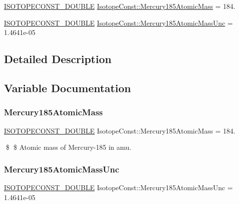 \begin{DoxyCompactItemize}
\item 
\mbox{\hyperlink{group___isotope_const-_macros_ga8f45a7272ce02c0b4c65c44636ed719a}{I\+S\+O\+T\+O\+P\+E\+C\+O\+N\+S\+T\+\_\+\+D\+O\+U\+B\+LE}} \mbox{\hyperlink{group___isotope_const-_mercury-_hg185_ga8bcadf89654409508bda0c419c9fcd31}{Isotope\+Const\+::\+Mercury185\+Atomic\+Mass}} = 184.
\item 
\mbox{\hyperlink{group___isotope_const-_macros_ga8f45a7272ce02c0b4c65c44636ed719a}{I\+S\+O\+T\+O\+P\+E\+C\+O\+N\+S\+T\+\_\+\+D\+O\+U\+B\+LE}} \mbox{\hyperlink{group___isotope_const-_mercury-_hg185_gaa6ebe570d12144ae57142c385b64184e}{Isotope\+Const\+::\+Mercury185\+Atomic\+Mass\+Unc}} = 1.\+4641e-\/05
\end{DoxyCompactItemize}


\subsection{Detailed Description}


\subsection{Variable Documentation}
\mbox{\label{group___isotope_const-_mercury-_hg185_ga8bcadf89654409508bda0c419c9fcd31}} 
\subsubsection{\texorpdfstring{Mercury185\+Atomic\+Mass}{Mercury185AtomicMass}}
{\footnotesize\ttfamily \mbox{\hyperlink{group___isotope_const-_macros_ga8f45a7272ce02c0b4c65c44636ed719a}{I\+S\+O\+T\+O\+P\+E\+C\+O\+N\+S\+T\+\_\+\+D\+O\+U\+B\+LE}} Isotope\+Const\+::\+Mercury185\+Atomic\+Mass = 184.}

\$ \$ Atomic mass of Mercury-\/185 in amu. \mbox{\label{group___isotope_const-_mercury-_hg185_gaa6ebe570d12144ae57142c385b64184e}} 
\subsubsection{\texorpdfstring{Mercury185\+Atomic\+Mass\+Unc}{Mercury185AtomicMassUnc}}
{\footnotesize\ttfamily \mbox{\hyperlink{group___isotope_const-_macros_ga8f45a7272ce02c0b4c65c44636ed719a}{I\+S\+O\+T\+O\+P\+E\+C\+O\+N\+S\+T\+\_\+\+D\+O\+U\+B\+LE}} Isotope\+Const\+::\+Mercury185\+Atomic\+Mass\+Unc = 1.\+4641e-\/05}

